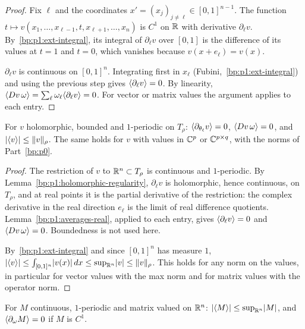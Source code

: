 \begin{proof}
\label{step:p1:ar-one}
Fix $\ell$ and the coordinates $x'=(x_j)_{j\ne\ell}\in[0,1]^{n-1}$. The function
$t\mapsto v(x_1,\dots,x_{\ell-1},t,x_{\ell+1},\dots,x_n)$ is $C^1$ on $\mathbb{R}$ with derivative $\partial_\ell v$.
By~\ref{bp:p1:ext-integral}, its integral of $\partial_\ell v$ over $[0,1]$ is the difference of its values
at $t=1$ and $t=0$, which vanishes because $v(x+e_\ell)=v(x)$.

\label{step:p1:ar-fubini}
$\partial_\ell v$ is continuous on $[0,1]^n$. Integrating first in $x_\ell$ (Fubini,~\ref{bp:p1:ext-integral})
and using the previous step gives $\langle \partial_\ell v\rangle=0$. By linearity,
$\langle Dv\,\omega\rangle=\sum_\ell\omega_\ell\langle \partial_\ell v\rangle=0$. For vector or matrix values the argument
applies to each entry.
\end{proof}

\begin{lemma}[Averages]\label{bp:p1:averages}
For $v$ holomorphic, bounded and $1$-periodic on $T_\rho$: $\langle \partial_{\theta_\ell}v\rangle=0$,
$\langle Dv\,\omega\rangle=0$, and $\lvert \langle v\rangle\rvert\le\lVert v\rVert_\rho$. The same holds for $v$ with values in $\mathbb{C}^p$ or
$\mathbb{C}^{p\times q}$, with the norms of Part~\ref{bp:p0}.
\end{lemma}

\begin{proof}
\label{step:p1:av-derivatives}
The restriction of $v$ to $\mathbb{R}^n\subset T_\rho$ is continuous and $1$-periodic. By
Lemma~\ref{bp:p1:holomorphic-regularity}, $\partial_\ell v$ is holomorphic, hence continuous, on $T_\rho$,
and at real points it is the partial derivative of the restriction: the complex derivative in the real
direction $e_\ell$ is the limit of real difference quotients. Lemma~\ref{bp:p1:averages-real}, applied
to each entry, gives $\langle \partial_\ell v\rangle=0$ and $\langle Dv\,\omega\rangle=0$. Boundedness is not used here.

\label{step:p1:av-bound}
By~\ref{bp:p1:ext-integral} and since $[0,1]^n$ has measure $1$,
$\lvert \langle v\rangle\rvert\le\int_{[0,1]^n}\lvert v(x)\rvert\,dx\le\sup_{\mathbb{R}^n}\lvert v\rvert\le\lVert v\rVert_\rho$. This holds for any norm
on the values, in particular for vector values with the max norm and for matrix values with the
operator norm.
\end{proof}

\begin{lemma}\label{bp:p1:averages-matrix}
For $M$ continuous, $1$-periodic and matrix valued on $\mathbb{R}^n$: $\lvert \langle M\rangle\rvert\le\sup_{\mathbb{R}^n}\lvert M\rvert$, and $\langle \partial_\omega M\rangle=0$ if
$M$ is $C^1$.
\end{lemma}

